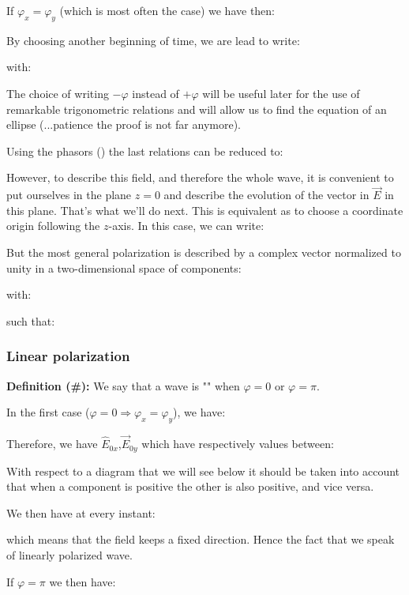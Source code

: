 	If $\varphi_x=\varphi_y$ (which is most often the case) we have then:
	
	By choosing another beginning of time, we are lead to write:
	
	with:
	
	\begin{tcolorbox}[title=Remark,colframe=black,arc=10pt]
	The choice of writing $-\varphi$ instead of $+\varphi$ will be useful later for the use of remarkable trigonometric relations and will allow us to find the equation of an ellipse (...patience the proof is not far anymore).
	\end{tcolorbox}
	Using the phasors () the last relations can be reduced to:
	
	However, to describe this field, and therefore the whole wave, it is convenient to put ourselves in the plane $z=0$ and describe the evolution of the vector in $\vec{E}$ in this plane. That's what we'll do next. This is equivalent as to choose a coordinate origin following the $z$-axis. In this case, we can write:
	
	But the most general polarization is described by a complex vector normalized to unity in a two-dimensional space of components:
	
	with:
	
	such that:
	
	
	
	\subsubsection{Linear polarization}\label{linear polarization}
	\textbf{Definition (\#\mydef):} We say that a wave is "" when $\varphi=0$ or $\varphi=\pi$.

	In the first case ($\varphi=0\Rightarrow \varphi_x=\varphi_y$), we have:
	
	
	Therefore, we have $\hat{E}_{0x}$,$\vec{E}_{0y}$ which have respectively values between:
	
	
	With respect to a diagram that we will see below it should be taken into account that when a component is positive the other is also positive, and vice versa.

	We then have at every instant:
	
	which means that the field keeps a fixed direction. Hence the fact that we speak of linearly polarized wave.

	If $\varphi=\pi$ we then have:
	
